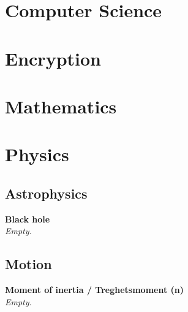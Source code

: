 \documentclass[12pt]{report}
\begin{document}
\setlength{\parskip}{1.5em}   %
\setlength\parindent{0pt}   %


\chapter{Computer Science}

















\chapter{Encryption}









\chapter{Mathematics}






\chapter{Physics}
\section{Astrophysics}
\textbf{Black hole} \\
\textit{Empty.}

\section{Motion}
\textbf{Moment of inertia / Treghetsmoment (n)} \\
\textit{Empty.}

    





\printindex


\raggedright                    %
\sloppy
\printbibliography[heading=bibintoc,title={Bibliography}]
\end{document}
